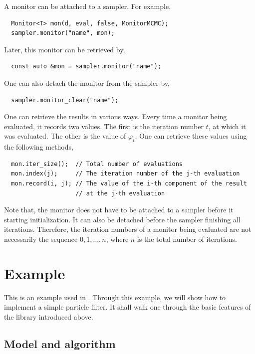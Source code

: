 A monitor can be attached to a sampler. For example,
\begin{Verbatim}
  Monitor<T> mon(d, eval, false, MonitorMCMC);
  sampler.monitor("name", mon);
\end{Verbatim}
Later, this monitor can be retrieved by,
\begin{Verbatim}
  const auto &mon = sampler.monitor("name");
\end{Verbatim}
One can also detach the monitor from the sampler by,
\begin{Verbatim}
  sampler.monitor_clear("name");
\end{Verbatim}
One can retrieve the results in various ways. Every time a monitor being
evaluated, it records two values. The first is the iteration number $t$, at
which it was evaluated. The other is the value of $\varphi_t$. One can retrieve
these values using the following methods,
\begin{Verbatim}
  mon.iter_size();  // Total number of evaluations
  mon.index(j);     // The iteration number of the j-th evaluation
  mon.record(i, j); // The value of the i-th component of the result
                    // at the j-th evaluation
\end{Verbatim}
Note that, the monitor does not have to be attached to a sampler before it
starting initialization. It can also be detached before the sampler finishing
all iterations. Therefore, the iteration numbers of a monitor being evaluated
are not necessarily the sequence $0,1,\dots,n$, where $n$ is the total number
of iterations.

\section{Example}
\label{sec:Example (Core concepts)}

This is an example used in \textcite{Johansen:2009wd}. Through this example, we
will show how to implement a simple particle filter. It shall walk one through
the basic features of the library introduced above.

\subsection{Model and algorithm}
\label{sub:Model and algorithm}

